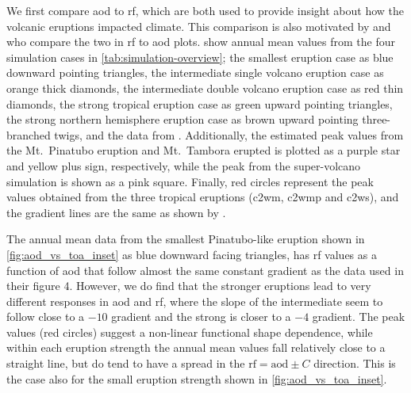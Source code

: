 \documentclass{ametsocV5}
\begin{document}
We first compare \ac{aod} to \ac{rf}, which are both used to provide insight about how
the volcanic eruptions impacted climate. This comparison is also motivated by
\citet[][their figure 4]{gregory2016} and \citet[][their figure 1]{marshall2020} who
compare the two in \ac{rf} to \ac{aod} plots.  show annual
mean values from the four simulation cases in \cref{tab:simulation-overview}; the
smallest eruption case as blue downward pointing triangles, the intermediate single
volcano eruption case as orange thick diamonds, the intermediate double volcano eruption
case as red thin diamonds, the strong tropical eruption case as green upward pointing
triangles, the strong northern hemisphere eruption case as brown upward pointing
three-branched twigs, and the data from \citet[][figure 4, black crosses from HadCM3
  sstPiHistVol]{gregory2016}. Additionally, the estimated peak values from the Mt.\
Pinatubo eruption and Mt.\ Tambora erupted is plotted as a purple star and yellow plus
sign, respectively, while the peak from the \citet{jones2005} super-volcano simulation
is shown as a pink square. Finally, red circles represent the peak values obtained from
the three tropical eruptions (\ac{c2wm}, \ac{c2wmp} and \ac{c2ws}), and the gradient
lines are the same as shown by \citet{gregory2016}.

The annual mean data from the smallest Pinatubo-like eruption shown in
\cref{fig:aod_vs_toa_inset} as blue downward facing triangles, has \ac{rf} values as a
function of \ac{aod} that follow almost the same constant gradient as the
\citet{gregory2016} data used in their figure 4. However, we do find that the stronger
eruptions lead to very different responses in \ac{aod} and \ac{rf}, where the slope of
the intermediate seem to follow close to a \( -10 \) gradient and the strong is closer
to a \( -4 \) gradient. The peak values (red circles) suggest a non-linear functional
shape dependence, while within each eruption strength the annual mean values fall
relatively close to a straight line, but do tend to have a spread in the
\(\mathrm{rf}=\mathrm{aod}\pm C\) direction. This is the case also for the small
eruption strength shown in \cref{fig:aod_vs_toa_inset}.
\end{document}
